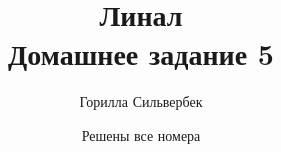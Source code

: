  
\title{ Линал \\
\large Домашнее задание 5}
\date{Решены все номера}
\author{Горилла Сильвербек}
 

\maketitle
 
 

 